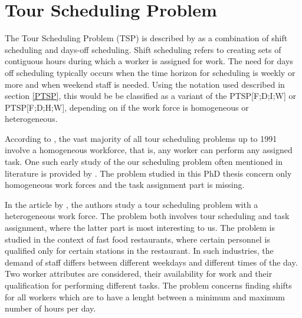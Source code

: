 
 

%
%
%
%


\section{Tour Scheduling Problem}\label{TSP}

The Tour Scheduling Problem (TSP) is described by \citet{loucks_1991} as a combination of shift scheduling and days-off scheduling. Shift scheduling refers to creating sets of contiguous hours during which a worker is assigned for work. The need for days off scheduling typically occurs when the time horizon for scheduling is weekly or more and when weekend staff is needed. Using the notation used described in section \ref{PTSP}, this would be be classified as a variant of the PTSP[F;D;I;W] or PTSP[F;D;H;W], depending on if the work force is homogeneous or heterogeneous.

According to \citet{loucks_1991}, the vast majority of all tour scheduling problems up to 1991 involve a homogeneous workforce, that is, any worker can perform any assigned task. One such early study of the our scheduling problem often mentioned in literature is provided by \citet{thompson_1988}. The problem studied in this PhD thesis concern only homogeneous work forces and the task assignment part is missing.

In the article by \citet{loucks_1991}, the authors study a tour scheduling problem with a heterogeneous work force. The problem both involves tour scheduling and task assignment, where the latter part is most interesting to us. The problem is studied in the context of fast food restaurants, where certain personnel is qualified only for certain stations in the restaurant. In such industries, the demand of staff differs between different weekdays and different times of the day. Two worker attributes are considered, their availability for work and their qualification for performing different tasks. The problem concerns finding shifts for all workers which are to have a lenght between a minimum and maximum number of hours per day.

